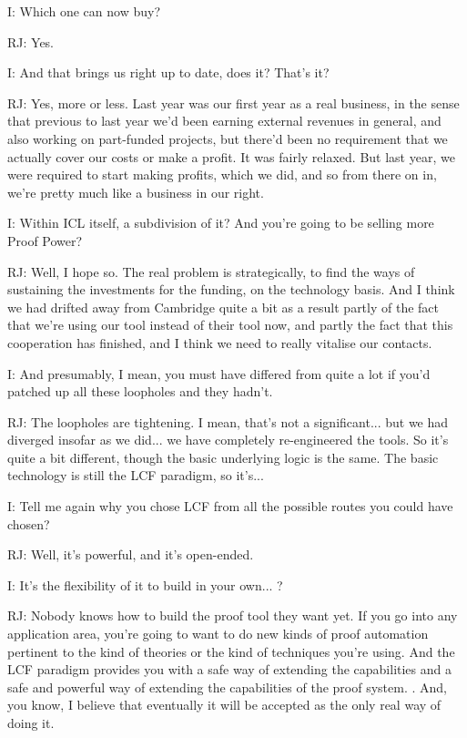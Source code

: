 \documentclass[10pt,titlepage]{book}
\begin{document}
I: Which one can now buy?

RJ: Yes.

I: And that brings us right up to date, does it? That's it?

RJ: Yes, more or less. Last year was our first year as a real business, in the sense that  previous to last year we'd been earning external revenues in general, and also working on part-funded projects, but there'd been no requirement that we actually cover our costs or make a profit. It was fairly relaxed. But last year, we were required to start making profits, which we did, and so from there on in, we're pretty much like a business in our right.

I: Within ICL itself, a subdivision of it? And you're going to be selling more Proof Power?

RJ: Well, I hope so. The real problem is strategically, to find the ways of sustaining the investments for the funding, on the technology basis. And I think we had drifted away from Cambridge quite a bit as a result partly of the fact that we're using our tool instead of their tool now, and partly the fact that this cooperation has finished, and I think we need to really vitalise our contacts.

I: And presumably, I mean, you must have differed from quite a lot if you'd patched up all these loopholes and they hadn't.

RJ: The loopholes are tightening. I mean, that's not a significant... but we had diverged insofar as we did... we have completely re-engineered the tools. So it's quite a bit different, though the basic underlying logic is the same. The basic technology is still the LCF paradigm, so it's...

I: Tell me again why you chose LCF from all the possible routes you could have chosen?

RJ: Well, it's powerful, and it's open-ended.

I: It's the flexibility of it to build in your own... ?

RJ: Nobody knows how to build the proof tool they want yet. If you go into any application area, you're going to want to do new kinds of proof automation pertinent to the kind of theories or the kind of techniques you're using. And the LCF paradigm provides you with a safe way of extending the capabilities and a safe and powerful way of extending the capabilities of the proof system. 		. And, you know, I believe that eventually it will be accepted as the only real way of doing it.
\end{document}
